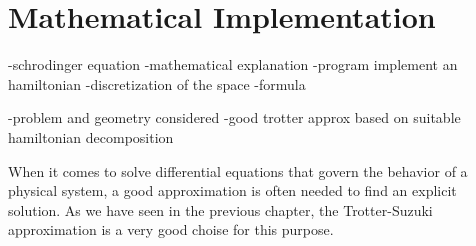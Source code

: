 \chapter{Mathematical Implementation}
-schrodinger equation
-mathematical explanation
-program implement an hamiltonian 
-discretization of the space
-formula

-problem and geometry considered
-good trotter approx based on suitable hamiltonian decomposition

When it comes to solve differential equations that govern the behavior of a physical system, a good approximation is often needed to find an explicit solution. As we have seen in the previous chapter, the Trotter-Suzuki approximation is a very good choise for this purpose. 

